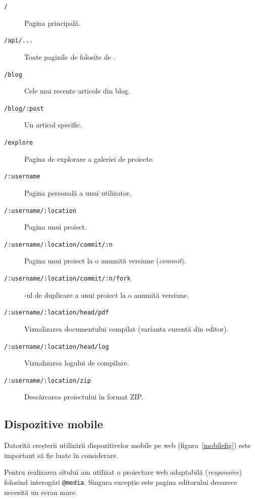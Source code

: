 \documentclass[a4wide,12pt]{report}
\newcommand{\eng}[1]{\emph{#1}} %
\newcommand{\cod}[1]{\texttt{#1}}
\newcommand{\acr}[1]{{\textsmaller[1]{\textsc{#1}}}} %
\begin{document}
\begin{description}

\item[\cod{/}] Pagina principală.

\item[\cod{/api/...}] Toate paginile de folosite de \acr{API}.

\item[\cod{/blog}] Cele mai recente articole din blog.

\item[\cod{/blog/:post}] Un articol specific.

\item[\cod{/explore}] Pagina de explorare a galeriei de proiecte.

\item[\cod{/:username}] Pagina personală a unui utilizator.

\item[\cod{/:username/:location}] Pagina unui proiect.

\item[\cod{/:username/:location/commit/:n}] Pagina unui proiect la o anumită
versiune (\eng{commit}).

\item[\cod{/:username/:location/commit/:n/fork}] \acr{URL}-ul de duplicare a
unui proiect la o anumită versiune.

\item[\cod{/:username/:location/head/pdf}] Vizualizarea documentului compilat
(varianta curentă din editor).

\item[\cod{/:username/:location/head/log}] Vizualizarea logului de compilare.

\item[\cod{/:username/:location/zip}] Descărcarea proiectului în format ZIP.

\end{description}

\subsection{Dispozitive mobile}

Datorită creșterii utilizării dispozitivelor mobile pe web
(figura~\ref{mobilefig}) este important să fie luate în considerare.

Pentru realizarea sitului am utilizat o proiectare web adaptabilă
(\eng{responsive}) folosind interogări \cod{@media}. Singura excepție este
pagina editorului deoarece necesită un ecran mare.
\end{document}
